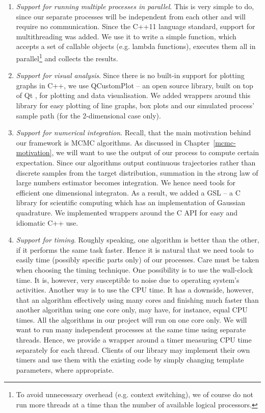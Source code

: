 \documentclass[report.tex]{subfiles}
\begin{document}
\begin{enumerate}
  \item \textit{Support for running multiple processes in parallel}. This is very
    simple to do, since our separate processes will be independent from each other
    and will require no communication.
    Since the C++11 language standard, support for multithreading was added.
    We use it to write a simple function,
    which accepts a set of callable objects (e.g. lambda functions),
    executes them all in parallel\footnote{To avoid unnecessary overhead
    (e.g. context switching), we of course do not run more threads at a time
    than the number of available logical processors.} and collects the results.

  \item \textit{Support for visual analysis}.
    Since there is no built-in support for plotting graphs in C++, we use
    QCustomPlot \cite{qcustomplot-library} -- an open source library, built on top of Qt
    \cite{qt-library}, for plotting and data visualisation.
    We added wrappers around this library for easy plotting of line graphs,
    box plots and our simulated process' sample path (for the 2-dimensional case only).

  \item \textit{Support for numerical integration}.
    Recall, that the main motivation behind our framework is MCMC algorithms.
    As discussed in Chapter~\ref{mcmc-motivation}, we will want to use the output
    of our process to compute certain expectation.
    Since our algorithms output continuous trajectories rather than discrete samples
    from the target distribution, summation in the strong law of large numbers estimator
    becomes integration. We hence need tools for efficient one dimensional integraton.
    As a result, we added a GSL \cite{gsl-library} -- a C library for scientific computing
    which has an implementation of Gaussian quadrature.
    We implemented wrappers around the C API for easy and idiomatic C++ use.

  \item \textit{Support for timing}.
    Roughly speaking, one algorithm is better than the other, if it performs
    the same task faster. Hence it is natural that we need tools to easily time
    (possibly specific parts only) of our processes. Care must be taken when choosing the
    timing technique. One possibility is to use the wall-clock time.
    It is, however, very susceptible to noise due to operating system's activities.
    Another way is to use the CPU time. It has a downside, however, that an
    algorithm effectively using many cores and finishing much faster than another
    algorithm using one core only, may have, for instance, equal CPU times.
    All the algorithms in our project will run on one core only. We will want to run
    many independent processes at the same time using separate threads. Hence, we
    provide a wrapper around a timer measuring CPU time separately for each thread.
    Clients of our library may implement their own timers and use them with the existing code
    by simply changing template parameters, where appropriate.
\end{enumerate}
\end{document}
